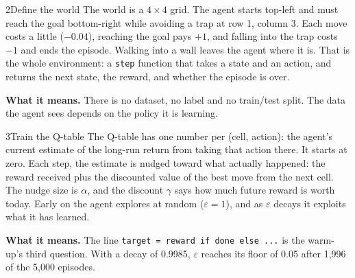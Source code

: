 \begin{labquestion}{2}{Define the world}
The world is a $4\times4$ grid. The agent starts top-left and must reach the goal bottom-right while avoiding a trap at row 1, column 3. Each move costs a little ($-0.04$), reaching the goal pays $+1$, and falling into the trap costs $-1$ and ends the episode. Walking into a wall leaves the agent where it is. That is the whole environment: a \texttt{step} function that takes a state and an action, and returns the next state, the reward, and whether the episode is over.
\end{labquestion}
\begin{labanswer}



\textbf{What it means.} There is no dataset, no label and no train/test split. The data the agent sees depends on the policy it is learning.
\end{labanswer}

\begin{labquestion}{3}{Train the Q-table}
The Q-table has one number per (cell, action): the agent's current estimate of the long-run return from taking that action there. It starts at zero. Each step, the estimate is nudged toward what actually happened: the reward received plus the discounted value of the best move from the next cell. The nudge size is $\alpha$, and the discount $\gamma$ says how much future reward is worth today. Early on the agent explores at random ($\varepsilon=1$), and as $\varepsilon$ decays it exploits what it has learned.
\end{labquestion}
\begin{labanswer}



\textbf{What it means.} The line \texttt{target = reward if done else ...} is the warm-up's third question. With a decay of 0.9985, $\varepsilon$ reaches its floor of 0.05 after 1,996 of the 5,000 episodes.
\end{labanswer}

